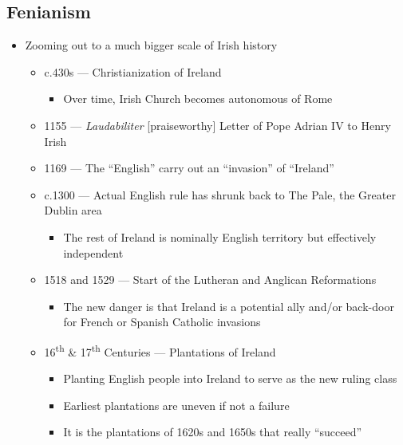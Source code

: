 \documentclass[12pt]{article}
\def\th{\textsuperscript{th}}
\begin{document}
        \subsection{Fenianism}
            \begin{itemize}
                \item Zooming out to a much bigger scale of Irish history
                \begin{itemize}
                    \item c.430s --- Christianization of Ireland
                    \begin{itemize}
                        \item Over time, Irish Church becomes autonomous of Rome
                    \end{itemize}
                    \item 1155 --- \textit{Laudabiliter} [praiseworthy] Letter of Pope Adrian IV to Henry Irish
                    \item 1169 --- The ``English'' carry out an ``invasion'' of ``Ireland''
                    \item c.1300 --- Actual English rule has shrunk back to The Pale, the Greater Dublin area
                    \begin{itemize}
                        \item The rest of Ireland is nominally English territory but effectively independent
                    \end{itemize}
                    \item 1518 and 1529 --- Start of the Lutheran and Anglican Reformations
                    \begin{itemize}
                        \item The new danger is that Ireland is a potential ally and/or back-door for French or Spanish Catholic invasions
                    \end{itemize}
                    \item 16\th{} \& 17\th{} Centuries --- Plantations of Ireland
                    \begin{itemize}
                        \item Planting English people into Ireland to serve as the new ruling class
                        \item Earliest plantations are uneven if not a failure
                        \item It is the plantations of 1620s and 1650s that really ``succeed''

\end{itemize}
\end{itemize}
\end{itemize}
\end{document}
